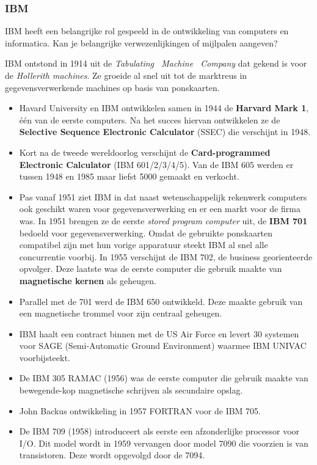 \documentclass[../main.tex]{subfiles}
\begin{document}
\subsubsection{IBM}
\begin{question}
IBM heeft een belangrijke rol gespeeld in de ontwikkeling van computers en informatica. Kan je belangrijke verwezenlijkingen of mijlpalen aangeven?
\end{question}
\begin{solution}
IBM ontstond in 1914 uit de \emph{Tabulating  Machine  Company} dat gekend is voor de \emph{Hollerith machines}. Ze groeide al snel uit tot de marktreus in gegevensverwerkende machines op basis van ponskaarten.
\begin{itemize}
	\item Havard University en IBM ontwikkelen samen in 1944 de \textbf{Harvard Mark 1}, \'e\'en van de eerste computers. Na het succes hiervan ontwikkelen ze de \textbf{Selective Sequence Electronic Calculator} (SSEC) die verschijnt in 1948.
	\item Kort na de tweede wereldoorlog verschijnt de \textbf{Card-programmed Electronic Calculator} (IBM 601/2/3/4/5). Van de IBM 605 werden er tussen 1948 en 1985 maar liefst 5000 gemaakt en verkocht.
	\item Pas vanaf 1951 ziet IBM in dat naast wetenschappelijk rekenwerk computers ook geschikt waren voor gegevensverwerking en er een markt voor de firma was. In 1951 brengen ze de eerste \emph{stored program computer} uit, de \textbf{IBM 701} bedoeld voor gegevensverwerking. Omdat de gebruikte ponskaarten compatibel zijn met hun vorige apparatuur steekt IBM al snel alle concurrentie voorbij. In 1955 verschijnt de IBM 702, de business georienteerde opvolger. Deze laatste was de eerste computer die gebruik maakte van \textbf{magnetische kernen} als geheugen.
	\item Parallel met de 701 werd de IBM 650 ontwikkeld. Deze maakte gebruik van een magnetische trommel voor zijn centraal geheugen.
	\item IBM haalt een contract binnen met de US Air Force en levert 30 systemen voor SAGE (Semi-Automatic Ground Environment) waarmee IBM UNIVAC voorbijsteekt.
	\item De IBM 305 RAMAC (1956) was de eerste computer die gebruik maakte van bewegende-kop magnetische schrijven als secundaire opslag.
	\item John Backus ontwikkeling in 1957 FORTRAN voor de IBM 705.
	\item De IBM 709 (1958) introduceert als eerste een afzonderlijke processor voor I/O. Dit model wordt in 1959 vervangen door model 7090 die voorzien is van transistoren. Deze wordt opgevolgd door de 7094.

\end{itemize}
\end{solution}
\end{document}

